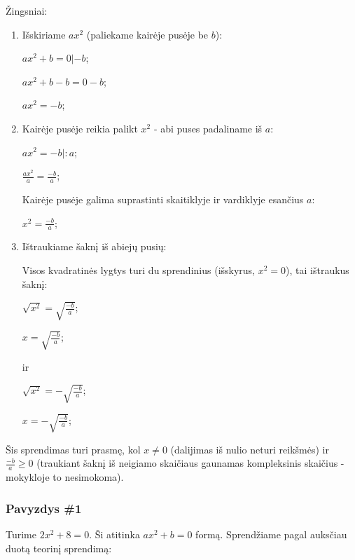 \documentclass[a4paper]{article}
\begin{document}
Žingsniai: 
\begin{enumerate}

    \item  Išskiriame $ ax^{2} $ (paliekame kairėje pusėje be $ b $):

    $ ax^{2}+b=0 | -b $;
    
    $ ax^{2}+b-b=0-b $;
    
    $ ax^{2}=-b $;
    
    \item Kairėje pusėje reikia palikt $ x^2 $ - abi puses padaliname iš $ a $:

    $ ax^{2}=-b |:a $;

    $ \frac{ax^{2}}{a}=\frac{-b}{a}$;

    Kairėje pusėje galima suprastinti skaitiklyje ir vardiklyje esančius $ a $:

    $ x^{2}=\frac{-b}{a}$;

    \item Ištraukiame šaknį iš abiejų pusių:
    
    Visos kvadratinės lygtys turi du sprendinius (išskyrus, $ x^2=0 $), tai ištraukus šaknį:

    $ \sqrt{x^{2}}=\sqrt{\frac{-b}{a}}$;

    $ x=\sqrt{\frac{-b}{a}}$;

    ir 

    $ \sqrt{x^{2}}=-\sqrt{\frac{-b}{a}}$;

    $ x=-\sqrt{\frac{-b}{a}}$;


\end{enumerate}

Šis sprendimas turi prasmę, kol $ x \neq 0 $ (dalijimas iš nulio neturi reikšmės) ir $ \frac{-b}{a} \ge 0 $ (traukiant šaknį iš neigiamo skaičiaus gaunamas kompleksinis skaičius - mokykloje to nesimokoma).

\subsubsection{Pavyzdys \#1}

Turime $ 2x^{2}+8=0 $. Ši atitinka $ ax^{2}+b=0 $ formą. Sprendžiame pagal auksčiau duotą teorinį sprendimą:
\end{document}
